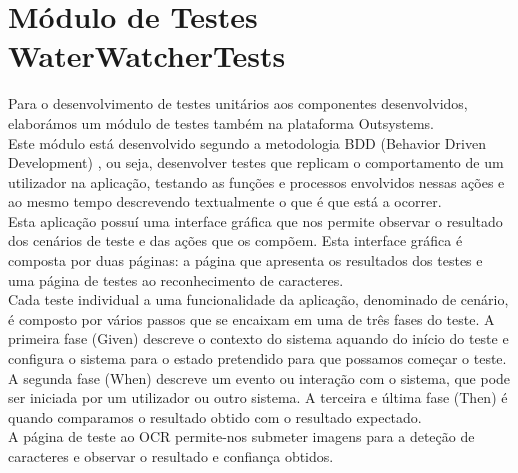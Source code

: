\section{Módulo de Testes WaterWatcherTests} \label{ecra:admin} %

Para o desenvolvimento de testes unitários aos componentes desenvolvidos, elaborámos um módulo de testes também na plataforma Outsystems.\\
Este módulo está desenvolvido segundo a metodologia BDD (Behavior Driven Development) \cite{bddtests}, ou seja, desenvolver testes que replicam o comportamento de um utilizador na aplicação, testando as funções e processos envolvidos nessas ações e ao mesmo tempo descrevendo textualmente o que é que está a ocorrer.\\
Esta aplicação possuí uma interface gráfica que nos permite observar o resultado dos cenários de teste e das ações que os compõem. Esta interface gráfica é composta por duas páginas: a página que apresenta os resultados dos testes e uma página de testes ao reconhecimento de caracteres.\\
Cada teste individual a uma funcionalidade da aplicação, denominado de cenário, é composto por vários passos que se encaixam em uma de três fases do teste. A primeira fase (Given) descreve o contexto do sistema aquando do início do teste e configura o sistema para o estado pretendido para que possamos começar o teste. A segunda fase (When) descreve um evento ou interação com o sistema, que pode ser iniciada por um utilizador ou outro sistema. A terceira e última fase (Then) é quando comparamos o resultado obtido com o resultado expectado.\\
A página de teste ao OCR permite-nos submeter imagens para a deteção de caracteres e observar o resultado e confiança obtidos.















